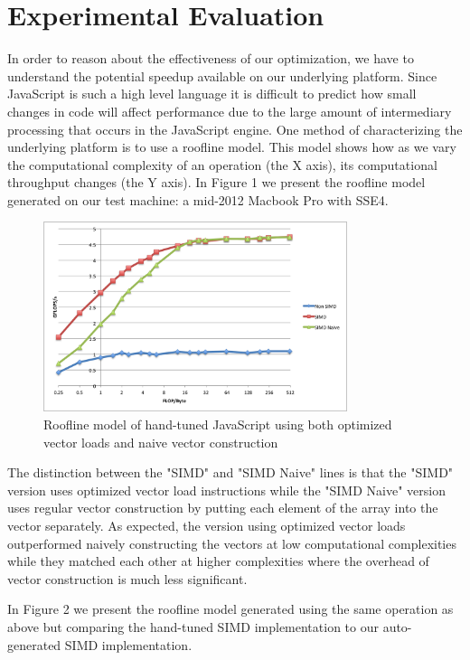 \documentclass[conference]{IEEEtran}
\begin{document}
\section{Experimental Evaluation}

In order to reason about the effectiveness of our optimization, we have to
understand the potential speedup available on our underlying platform. Since
JavaScript is such a high level language it is difficult to predict how small
changes in code will affect performance due to the large amount of intermediary
processing that occurs in the JavaScript engine. One method of characterizing
the underlying platform is to use a roofline model\cite{roofline}. This model
shows how as we vary the computational complexity of an operation (the X axis),
its computational throughput changes (the Y axis). In Figure 1 we present the
roofline model generated on our test machine: a mid-2012 Macbook Pro with SSE4.

\begin{figure}[!t]
    \centering
    \includegraphics[width=3.5in]{roofline1}
    \caption{Roofline model of hand-tuned JavaScript using both optimized vector loads and naive vector construction}
\end{figure}

The distinction between the "SIMD" and "SIMD Naive" lines is that the "SIMD"
version uses optimized vector load instructions while the "SIMD Naive" version
uses regular vector construction by putting each element of the array into the
vector separately.  As expected, the version using optimized vector loads
outperformed naively constructing the vectors at low computational complexities
while they matched each other at higher complexities where the overhead of
vector construction is much less significant.

In Figure 2 we present the roofline model generated using the same operation as
above but comparing the hand-tuned SIMD implementation to our auto-generated
SIMD implementation.
\end{document}
